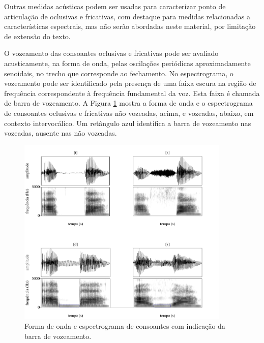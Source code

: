 \documentclass[portuguese]{textolivre}
\begin{document}
Outras medidas acústicas podem ser usadas para caracterizar ponto de articulação de oclusivas e fricativas, com destaque para medidas relacionadas a características espectrais, mas não serão abordadas neste material, por limitação de extensão do texto.

O vozeamento das consoantes oclusivas e fricativas pode ser avaliado acusticamente, na forma de onda, pelas oscilações periódicas aproximadamente senoidais, no trecho que corresponde ao fechamento. No espectrograma, o vozeamento pode ser identificado pela presença de uma faixa escura na região de frequência correspondente à frequência fundamental da voz. Esta faixa é chamada de barra de vozeamento. A Figura \ref{fig15} mostra a forma de onda e o espectrograma de consoantes oclusivas e fricativas não vozeadas, acima, e vozeadas, abaixo, em contexto intervocálico. Um retângulo azul identifica a barra de vozeamento nas vozeadas, ausente nas não vozeadas.

\begin{figure}[H]
 \centering
 \includegraphics[width=0.9\textwidth]{Fig15.pdf}
 \caption{Forma de onda e espectrograma de consoantes com indicação da barra de vozeamento.}
 \label{fig15}
\end{figure}
\end{document}
